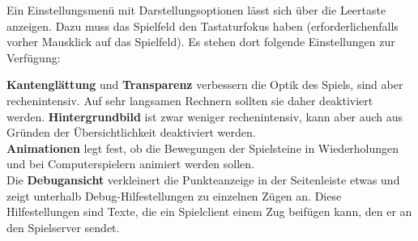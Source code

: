 \documentclass[a4paper, ngerman]{scrartcl}
\begin{document}
	Ein Einstellungsmenü mit Darstellungsoptionen lässt
sich über die Leertaste anzeigen. Dazu muss das
Spielfeld den Tastaturfokus haben (erforderlichenfalls
vorher Mausklick auf das Spielfeld). Es stehen dort
folgende Einstellungen zur Verfügung:

\textbf{Kantenglättung} und \textbf{Transparenz} verbessern die Optik des
Spiels, sind aber rechenintensiv. Auf sehr langsamen Rechnern sollten sie daher
deaktiviert werden. \textbf{Hintergrundbild} ist zwar weniger rechenintensiv,
kann aber auch aus Gründen der Übersichtlichkeit deaktiviert werden.\\
\textbf{Animationen} legt fest, ob die Bewegungen der Spielsteine in
Wiederholungen und bei Computerspielern animiert werden sollen.\\
Die \textbf{Debugansicht} verkleinert die Punkteanzeige in der Seitenleiste
etwas und zeigt unterhalb Debug-Hilfestellungen zu einzelnen Zügen an. Diese
Hilfestellungen sind Texte, die ein Spielclient einem Zug beifügen kann, den er
an den Spielserver sendet.
	
\end{document}
